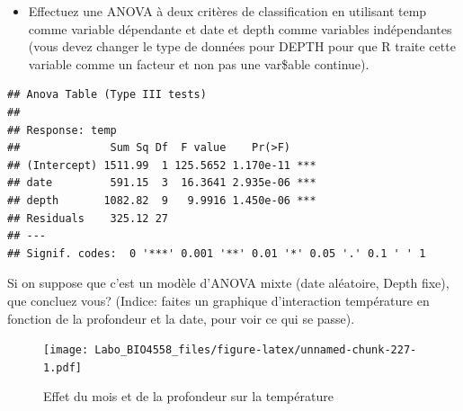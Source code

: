 \documentclass[12pt,]{book}
\newenvironment{Shaded}{\begin{snugshade}}{\end{snugshade}}
\newcommand{\DataTypeTok}[1]{\textcolor[rgb]{0.13,0.29,0.53}{#1}}
\newcommand{\DecValTok}[1]{\textcolor[rgb]{0.00,0.00,0.81}{#1}}
\newcommand{\KeywordTok}[1]{\textcolor[rgb]{0.13,0.29,0.53}{\textbf{#1}}}
\newcommand{\NormalTok}[1]{#1}
\newcommand{\OperatorTok}[1]{\textcolor[rgb]{0.81,0.36,0.00}{\textbf{#1}}}
\newcommand{\StringTok}[1]{\textcolor[rgb]{0.31,0.60,0.02}{#1}}
\providecommand{\tightlist}{%
  \setlength{\itemsep}{0pt}\setlength{\parskip}{0pt}}
\begin{document}
\begin{itemize}
\tightlist
\item
  Effectuez une ANOVA à deux critères de classification en utilisant temp comme variable dépendante et date et depth comme variables indépendantes (vous devez changer le type de données pour DEPTH pour que R traite cette variable comme un facteur et non pas une var\$able continue).
\end{itemize}

\begin{Shaded}
\end{Shaded}

\begin{verbatim}
## Anova Table (Type III tests)
## 
## Response: temp
##              Sum Sq Df  F value    Pr(>F)    
## (Intercept) 1511.99  1 125.5652 1.170e-11 ***
## date         591.15  3  16.3641 2.935e-06 ***
## depth       1082.82  9   9.9916 1.450e-06 ***
## Residuals    325.12 27                       
## ---
## Signif. codes:  0 '***' 0.001 '**' 0.01 '*' 0.05 '.' 0.1 ' ' 1
\end{verbatim}

Si on suppose que c'est un modèle d'ANOVA mixte (date aléatoire, Depth fixe), que concluez vous? (Indice: faites un graphique d'interaction température en fonction de la profondeur et la date, pour voir ce qui se passe).

\begin{Shaded}
\end{Shaded}

\begin{figure}
\centering
\texttt{[image: Labo\_BIO4558\_files/figure-latex/unnamed-chunk-227-1.pdf]}
\caption{\label{fig:unnamed-chunk-227}Effet du mois et de la profondeur sur la température}
\end{figure}
\end{document}
